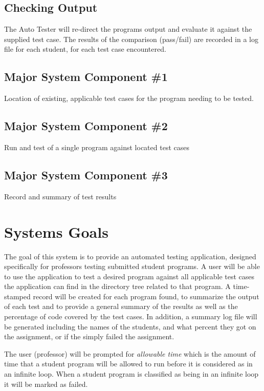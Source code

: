 \subsection{Checking Output}
The Auto Tester will re-direct the programs output and evaluate it against the supplied test case. 
The results of the comparison (pass/fail) are recorded in a log file for each student, for each 
test case encountered.



\subsection{Major System Component \#1}
Location of existing, applicable test cases for the program needing to be tested.

\subsection{Major System Component \#2}
Run and test of a single program against located test cases

\subsection{Major System Component \#3}
Record and summary of test results

\section{Systems Goals}
The goal of this system is to provide an automated testing application, designed specifically
for professors testing submitted student programs. A user will be able to use the application
to test a desired program against all applicable test cases the application can find in the directory tree 
related to that program.  A time-stamped record will be created for each program found, to summarize the 
output of each test and to provide a general summary of the results as well as the percentage of code covered by the test cases. In addition, a summary log file will be 
generated including the names of the students, and what percent they got on the assignment, or if the simply 
failed the assignment.

The user (professor) will be prompted for \textit{allowable time} which is the amount of time that a student program will be allowed to run before it is considered as in an infinite loop. When a student program is classified as being in an infinite loop it will be marked as failed.

